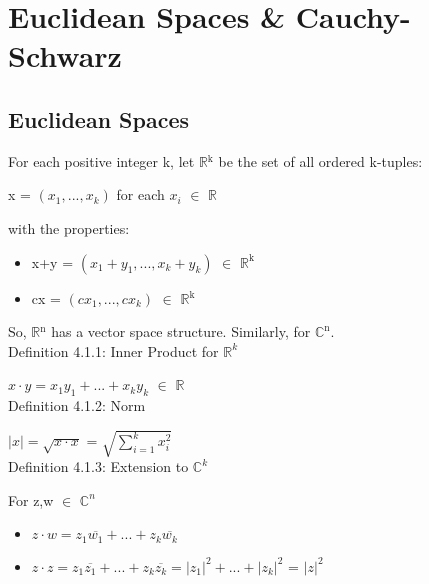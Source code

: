 \newpage
\section[Day 4: Euclidean Spaces \& Cauchy-Schwarz]
{Euclidean Spaces \& Cauchy-Schwarz}





\subsection{Euclidean Spaces}

	For each positive integer k, let $\mathbb{R}$$^\text{k}$ be the set of all ordered k-tuples:

	\qquad x = $(x_1,...,x_k)$	\qquad \qquad for each $x_i$ $\in$ $\mathbb{R}$

	with the properties:
	\begin{itemize}[leftmargin=1cm, itemsep=0.1cm]
		\item x+y = $(x_1+y_1,...,x_k+y_k)$ $\in$ $\mathbb{R}^{\text{k}}$
	
		\item cx = $(cx_1,...,cx_k)$ $\in$ $\mathbb{R}$$^\text{k}$
	\end{itemize}

	So, $\mathbb{R}$$^\text{n}$ has a vector space structure. Similarly, for $\mathbb{C}^{\text{n}}$. \\


{ \color{blue} Definition 4.1.1: Inner Product for $\mathbb{R}^k$}

	\begin{adjustbox}{minipage=14cm, right, vspace=0.1cm 0cm}
		$x \cdot y = x_1y_1 + ... + x_ky_k$ $\in$ $\mathbb{R}$ \\
	\end{adjustbox}

{ \color{blue} Definition 4.1.2: Norm }

	\begin{adjustbox}{minipage=14cm, right, vspace=0.1cm 0cm}
		$|x| = \sqrt{x \cdot x}$ = $\sqrt{\sum_{i=1}^k x_i^2}$ \\
	\end{adjustbox}

{ \color{blue} Definition 4.1.3: Extension to $\mathbb{C}^k$ } 

	\hspace{1cm}
	For z,w $\in$ $\mathbb{C}^n$
	
	\begin{itemize}[leftmargin=2cm, itemsep=0.1cm]
		\item $z \cdot w = z_1\overline{w_1} + ... + z_k\overline{w_k}$
	
		\item $z \cdot z = z_1\overline{z_1} + ... + z_k\overline{z_k}
			= |z_1|^2 + ... + |z_k|^2$ = $|z|^2$
	\end{itemize}





